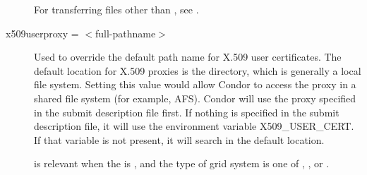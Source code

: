 \begin{description}
For transferring files other than ,
see .


\item[x509userproxy = $<$full-pathname$>$] Used to override the default
path name for X.509 user certificates. The default location for X.509 proxies
is the  directory,
which is generally a local file system.
Setting
this value would allow Condor to access the proxy in a shared file system
(for example, AFS).
Condor will use the proxy specified in the submit description file first.
If nothing is specified in the submit description file,
it will use the environment variable X509\_USER\_CERT.
If that variable is not present,
it will search in the default location.

 is relevant when
the  is ,
and the type of grid system is one of ,
, or .

\end{description} 


